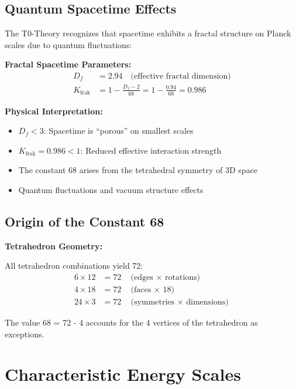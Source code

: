 \documentclass[12pt,a4paper]{article}
\newcommand{\Kfrak}{K_{\text{frak}}}
\newcommand{\Dfrak}{D_f}
\begin{document}
	\subsection{Quantum Spacetime Effects}
	
	The T0-Theory recognizes that spacetime exhibits a fractal structure on Planck scales due to quantum fluctuations:
	
	\begin{keyresult}
		\textbf{Fractal Spacetime Parameters:}
		\begin{align}
			\Dfrak &= 2.94 \quad \text{(effective fractal dimension)} \\
			\Kfrak &= 1 - \frac{\Dfrak - 2}{68} = 1 - \frac{0.94}{68} = 0.986
		\end{align}
		
		\textbf{Physical Interpretation:}
		\begin{itemize}
			\item $\Dfrak < 3$: Spacetime is ``porous'' on smallest scales
			\item $\Kfrak = 0.986 < 1$: Reduced effective interaction strength
			\item The constant 68 arises from the tetrahedral symmetry of 3D space
			\item Quantum fluctuations and vacuum structure effects
		\end{itemize}
	\end{keyresult}
	
	\subsection{Origin of the Constant 68}
	
	\begin{alternative}
		\textbf{Tetrahedron Geometry:}
		
		All tetrahedron combinations yield 72:
		\begin{align}
			6 \times 12 &= 72 \quad \text{(edges $\times$ rotations)} \\
			4 \times 18 &= 72 \quad \text{(faces $\times$ 18)} \\
			24 \times 3 &= 72 \quad \text{(symmetries $\times$ dimensions)}
		\end{align}
		
		The value 68 = 72 - 4 accounts for the 4 vertices of the tetrahedron as exceptions.
	\end{alternative}
	
	\section{Characteristic Energy Scales}
	
\end{document}
